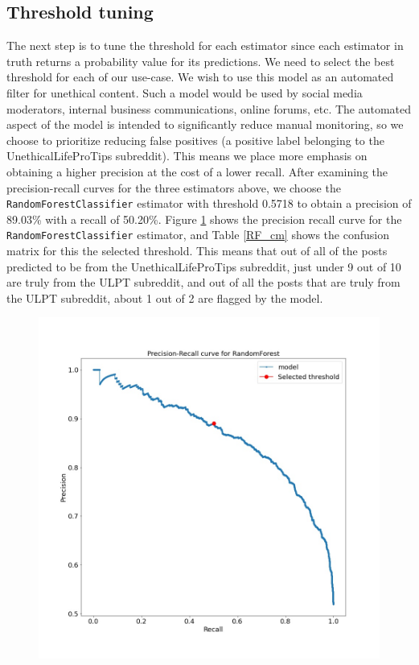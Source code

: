 \documentclass{amsart}
\theoremstyle{definition}
\theoremstyle{remark}
\begin{document}
\subsection{Threshold tuning}
The next step is to tune the threshold for each estimator since each estimator in truth returns a probability value for its predictions.  We need to select the best threshold for each of our use-case.  We wish to use this model as an automated filter for unethical content.  Such a model would be used by social media moderators, internal business communications, online forums, etc.  The automated aspect of the model is intended to significantly reduce manual monitoring, so we choose to prioritize reducing false positives (a positive label belonging to the UnethicalLifeProTips subreddit).  This means we place more emphasis on obtaining a higher precision at the cost of a lower recall.  After examining the precision-recall curves for the three estimators above, we choose the \texttt{RandomForestClassifier} estimator with threshold 0.5718 to obtain a precision of 89.03\% with a recall of 50.20\%.  Figure \ref{RF_precision_recall} shows the precision recall curve for the \texttt{RandomForestClassifier} estimator, and Table \ref{RF_cm} shows the confusion matrix for this the selected threshold. This means that out of all of the posts predicted to be from the UnethicalLifeProTips subreddit, just under 9 out of 10 are truly from the ULPT subreddit, and out of all the posts that are truly from the ULPT subreddit, about 1 out of 2 are flagged by the model.  

\begin{figure}
\centering
\includegraphics[width=12cm]{RF_precision_recall.jpeg}
\label{RF_precision_recall} 
\end{figure}
\end{document}
